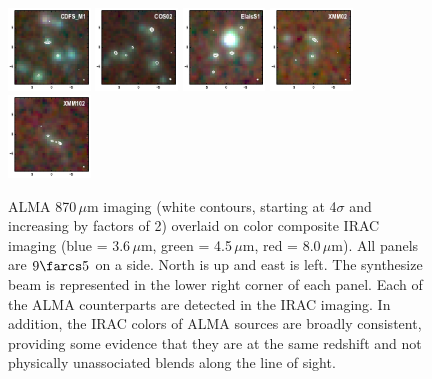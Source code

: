 \documentclass[iop]{emulateapj}
\begin{document}
\begin{figure}[!tbp] 
    \begin{centering}
\includegraphics[width=0.195\textwidth]{../Figures/CDFS_M1_rgb.pdf}
\includegraphics[width=0.195\textwidth]{../Figures/COS02_rgb.pdf}
\includegraphics[width=0.195\textwidth]{../Figures/ElaisS1_rgb.pdf}
\includegraphics[width=0.195\textwidth]{../Figures/XMM02_rgb.pdf}
\includegraphics[width=0.195\textwidth]{../Figures/XMM102_rgb.pdf}
\end{centering}

\caption{ ALMA 870$\,\mu$m imaging (white contours, starting at 4$\sigma$ and
increasing by factors of 2) overlaid on color composite IRAC imaging (blue =
3.6$\,\mu$m, green = 4.5$\,\mu$m, red = 8.0$\,\mu$m).  All panels are $9\farcs5$
on a side.  North is up and east is left.  The synthesize beam is represented in
the lower right corner of each panel.  Each of the ALMA counterparts are
detected in the IRAC imaging.  In addition, the IRAC colors of ALMA sources are
broadly consistent, providing some evidence that they are at the same redshift
and not physically unassociated blends along the line of
sight.}\label{fig:iraccolor}

\end{figure}
\end{document}
